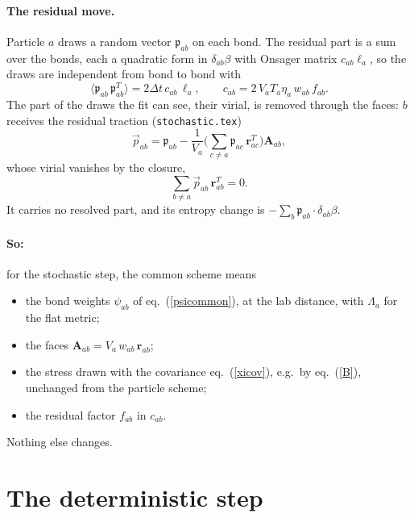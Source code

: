 \documentclass[11pt,aps,preprint,nofootinbib,superscriptaddress,tightenlines]{revtex4-2}
\def\st{\begin{equation}}
\def\stp{\end{equation}}
\def\Eq#1{eq.~(\ref{#1})}
\let\oldparagraph\paragraph
\renewcommand{\paragraph}{\par\bigskip\oldparagraph}
\begin{document}
\paragraph{The residual move.}  Particle $a$ draws a random vector $\mathfrak p_{ab}$ on each bond.  The residual part is a sum over the bonds,
each a quadratic form in $\delta_{ab}\beta$ with Onsager matrix $c_{ab}\ell_a$, so the draws are independent from bond to bond with
\st
\big\langle\mathfrak p_{ab}\,\mathfrak p_{ab}^T\big\rangle=2\Delta t\,c_{ab}\,\ell_a ,\qquad
c_{ab}=2\,V_aT_a\eta_a\,w_{ab}\,f_{ab} .
\stp
The part of the draws the fit can see, their virial, is removed through the faces: $b$ receives the residual traction
(\texttt{stochastic.tex})
\st
\vec p_{ab}=\mathfrak p_{ab}-\frac1{V_a}\Big(\sum_{c\neq a}\mathfrak p_{ac}\,\bm r_{ac}^T\Big)\bm A_{ab} ,
\stp
whose virial vanishes by the closure,
\st
\sum_{b\neq a}\vec p_{ab}\,\bm r_{ab}^T=0 .
\stp
It carries no resolved part, and its entropy change is $-\sum_b\mathfrak p_{ab}\cdot\delta_{ab}\beta$.

\paragraph{So:} for the stochastic step, the common scheme means
\begin{itemize}
\item the bond weights $\psi_{ab}$ of \Eq{psicommon}, at the lab distance, with $\Lambda_a$ for the flat metric;
\item the faces $\bm A_{ab}=V_a\,w_{ab}\,\bm r_{ab}$;
\item the stress drawn with the covariance \Eq{xicov}, e.g.\ by \Eq{B}, unchanged from the particle scheme;
\item the residual factor $f_{ab}$ in $c_{ab}$.
\end{itemize}
Nothing else changes.

\section{The deterministic step}
\label{sec:det}
\end{document}

